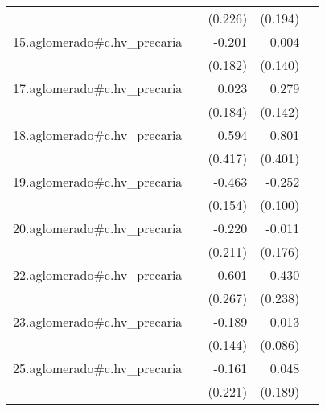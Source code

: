 {\begin{longtable}{l*{4}{D{.}{.}{-1}}}
            &                     &     (0.226)         &     (0.194)         &                     \\
\addlinespace
15.aglomerado#c.hv\_precaria&                     &      -0.201         &       0.004         &                     \\
            &                     &     (0.182)         &     (0.140)         &                     \\
\addlinespace
17.aglomerado#c.hv\_precaria&                     &       0.023         &       0.279\sym{*}  &                     \\
            &                     &     (0.184)         &     (0.142)         &                     \\
\addlinespace
18.aglomerado#c.hv\_precaria&                     &       0.594         &       0.801\sym{*}  &                     \\
            &                     &     (0.417)         &     (0.401)         &                     \\
\addlinespace
19.aglomerado#c.hv\_precaria&                     &      -0.463\sym{**} &      -0.252\sym{*}  &                     \\
            &                     &     (0.154)         &     (0.100)         &                     \\
\addlinespace
20.aglomerado#c.hv\_precaria&                     &      -0.220         &      -0.011         &                     \\
            &                     &     (0.211)         &     (0.176)         &                     \\
\addlinespace
22.aglomerado#c.hv\_precaria&                     &      -0.601\sym{*}  &      -0.430         &                     \\
            &                     &     (0.267)         &     (0.238)         &                     \\
\addlinespace
23.aglomerado#c.hv\_precaria&                     &      -0.189         &       0.013         &                     \\
            &                     &     (0.144)         &     (0.086)         &                     \\
\addlinespace
25.aglomerado#c.hv\_precaria&                     &      -0.161         &       0.048         &                     \\
            &                     &     (0.221)         &     (0.189)         &                     \\

\end{longtable}}
